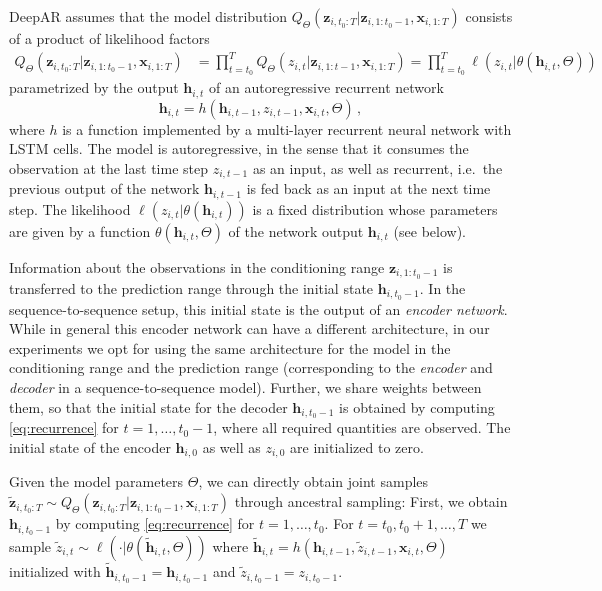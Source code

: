 \documentclass{article}
\newcommand{\z}[2]{z_{#1, #2}}
\newcommand{\xbf}{\mathbf{x}}
\newcommand{\zVec}[3]{\mathbf{z}_{#1, #2:#3}}
\newcommand{\xVec}[3]{\mathbf{x}_{#1, #2:#3}}
\newcommand{\hVec}{\mathbf{h}}
\begin{document}
\newcommand{\modelDist}{Q_\Theta(\zVec{i}{t_0}{T} | \zVec{i}{1}{t_0-1}, \xVec{i}{1}{T})}

DeepAR assumes that the model distribution $\modelDist$ consists of a product of likelihood factors
\begin{align*}
\modelDist &= \prod\nolimits_{t=t_0}^T Q_\Theta(z_{i,t}|\mathbf{z}_{i,1:t-1}, \xVec{i}{1}{T}) = \prod\nolimits_{t=t_0}^T \ell(\z{i}{t} | \theta(\hVec_{i, t}, \Theta))
\end{align*}
parametrized by the output $\hVec_{i, t}$ of an autoregressive recurrent network
\begin{equation}
\hVec_{i, t} = h\left(\hVec_{i, t-1}, \z{i}{t-1}, \xbf_{i, t}, \Theta\right) \,,
\label{eq:recurrence}
\end{equation}
where $h$ is a function implemented by a multi-layer recurrent neural network with LSTM cells. The model is autoregressive, in the sense that it consumes the observation at the last time step $\z{i}{t-1}$ as an input, as well as recurrent, i.e.\ the previous output of the network $\hVec_{i,t-1}$ is fed back as an input at the next time step. The likelihood $\ell(\z{i}{t}|\theta(\hVec_{i,t}))$ is a fixed distribution whose parameters are given by a function $\theta(\hVec_{i,t}, \Theta)$ of the network output $\hVec_{i, t}$ (see below).

Information about the observations in the conditioning range $\zVec{i}{1}{t_0 -1}$ is transferred to the prediction range through the initial state $\hVec_{i, t_0-1}$. In the sequence-to-sequence setup, this initial state is the output of an \emph{encoder network}. While in general this encoder network can have a different architecture, in our  experiments we opt for using the same architecture for the model in the conditioning range and the prediction range (corresponding to the \emph{encoder} and \emph{decoder} in a sequence-to-sequence model). Further, we share weights between them, so that the initial state for the decoder $\hVec_{i, t_0 - 1}$ is obtained by computing \eqref{eq:recurrence} for $t = 1, \ldots, t_0 - 1$, where all required quantities are observed. The initial state of the encoder $\hVec_{i, 0}$ as well as $\z{i}{0}$ are initialized to zero.

Given the model parameters $\Theta$, we can directly obtain joint samples
$\tilde{\mathbf{z}}_{i, t_0:T} \sim \modelDist$ through ancestral sampling:
First, we obtain $\hVec_{i, t_0-1}$ by computing \eqref{eq:recurrence} for $t=1,\ldots, t_0$. For $t=t_0, t_0+1, \ldots, T$ we sample $\tilde{z}_{i, t} \sim \ell(\cdot | \theta(\tilde{\mathbf{h}}_{i,t}, \Theta))$ where $\tilde{\mathbf{h}}_{i, t} = h\left(\hVec_{i, t-1}, \tilde{z}_{i, t-1}, \xbf_{i, t}, \Theta\right)$ initialized with $\tilde{\mathbf{h}}_{i, t_0-1} = \hVec_{i, t_0-1}$ and $\tilde{z}_{i, t_0 -1} = \z{i}{t_0 - 1}$.
\end{document}
